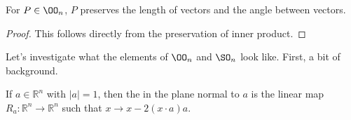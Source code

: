 \documentclass[a4paper]{scrartcl}
\begin{document}
\begin{corollary}
	For $P \in \OO_n$, $P$ preserves the length of vectors and the angle between vectors.
\end{corollary}
\begin{proof}
	This follows directly from the preservation of inner product.
\end{proof}

Let's investigate what the elements of $\OO_n$ and $\SO_n$ look like. First, a bit of background.

\begin{definition}
	If $a \in \mathbb{R}^n$ with $|a| = 1$, then the  in the plane normal to $a$ is the linear map $R_a: \mathbb{R}^n \rightarrow \mathbb{R}^n$ such that $x \rightarrow x - 2(x\cdot a)a$.
	\begin{center}
		


\begin{tikzpicture}[x=0.75pt,y=0.75pt,yscale=-0.65,xscale=0.65]


\end{tikzpicture}
\end{center}
\end{definition}
\end{document}
